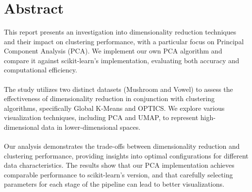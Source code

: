 \section{Abstract}
\label{sec:abstract}

\paragraph{}
This report presents an investigation into dimensionality reduction techniques 
and their impact on clustering performance, with a particular focus on 
Principal Component Analysis (PCA). We implement our own PCA algorithm 
and compare it against scikit-learn's implementation, evaluating both 
accuracy and computational efficiency.

\paragraph{}
The study utilizes two distinct datasets (Mushroom and Vowel) to assess 
the effectiveness of dimensionality reduction in conjunction with clustering 
algorithms, specifically Global K-Means and OPTICS. We explore various 
visualization techniques, including PCA and UMAP, to represent high-dimensional 
data in lower-dimensional spaces.

\paragraph{}
Our analysis demonstrates the trade-offs between dimensionality reduction 
and clustering performance, providing insights into optimal configurations 
for different data characteristics. The results show that our PCA implementation 
achieves comparable performance to scikit-learn's version, and that carefully
selecting parameters for each stage of the pipeline can lead to better visualizations.

